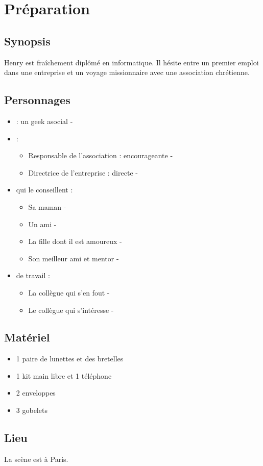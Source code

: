 \section{Préparation}

	\subsection{Synopsis}

	Henry est fraîchement diplômé en informatique.
	Il hésite entre un premier emploi dans une entreprise
	et un voyage missionnaire avec une association
	chrétienne.

	\subsection{Personnages}
	
	\begin{itemize}
	\item {} : un geek asocial - 
	\item {} : 
		\begin{itemize}
		\item Responsable de l'association : encourageante  -  
		\item Directrice de l'entreprise : directe - 
		\end{itemize}
	\item {} qui le conseillent :
		\begin{itemize}
		\item Sa maman - 
		\item Un ami - 
		\item La fille dont il est amoureux - 
		\item Son meilleur ami et mentor - 
		\end{itemize}
	\item {} de travail :
		\begin{itemize}
		\item La collègue qui s'en fout - 
		\item Le collègue qui s'intéresse - 
		\end{itemize}
	\end{itemize}
	
	\subsection{Matériel}
	
	\begin{itemize}
	\item 1 paire de lunettes et des bretelles
	\item 1 kit main libre et 1 téléphone
	\item 2 enveloppes
	\item 3 gobelets
	\end{itemize}
	
	\subsection{Lieu}
	
	La scène est à Paris.